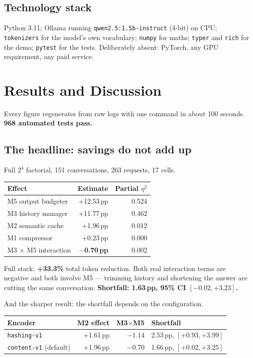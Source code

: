 \documentclass[11pt,a4paper]{article}
\begin{document}
\subsection{Technology stack}
Python 3.11; Ollama running \texttt{qwen2.5:1.5b-instruct} (4-bit) on CPU;
\texttt{tokenizers} for the model's own vocabulary; \texttt{numpy} for maths;
\texttt{typer} and \texttt{rich} for the demo; \texttt{pytest} for the tests.
Deliberately absent: PyTorch, any GPU requirement, any paid service.

\newpage
\section{Results and Discussion}

Every figure regenerates from raw logs with one command in about 100 seconds.
\textbf{968 automated tests pass.}

\subsection{The headline: savings do not add up}
Full $2^4$ factorial, 151 conversations, 263 requests, 17 cells.

\begin{center}
\begin{tabular}{@{}lrr@{}}
\toprule
\textbf{Effect} & \textbf{Estimate} & \textbf{Partial $\eta^2$} \\
\midrule
M5 output budgeter & +12.53\,pp & 0.524 \\
M3 history manager & +11.77\,pp & 0.462 \\
M2 semantic cache  & +1.96\,pp  & 0.012 \\
M1 compressor      & +0.23\,pp  & 0.000 \\
M3 $\times$ M5 interaction & \textbf{$-$0.70\,pp} & 0.002 \\
\bottomrule
\end{tabular}
\end{center}

Full stack: \textbf{+33.3\%} total token reduction. Both real interaction terms are
negative and both involve M5 --- trimming history and shortening the answer are cutting
the same conversation. \textbf{Shortfall: 1.63\,pp, 95\% CI $[-0.02,+3.23]$.}

And the sharper result: the shortfall depends on the configuration.

\begin{center}
\begin{tabular}{@{}lrrl@{}}
\toprule
\textbf{Encoder} & \textbf{M2 effect} & \textbf{M3$\times$M5} & \textbf{Shortfall} \\
\midrule
\texttt{hashing-v1} & +1.61\,pp & $-$1.14 & 2.53\,pp, $[+0.93,+3.99]$ \\
\texttt{content-v1} (default) & +1.96\,pp & $-$0.70 & 1.66\,pp, $[+0.02,+3.25]$ \\
\bottomrule
\end{tabular}
\end{center}
\end{document}
